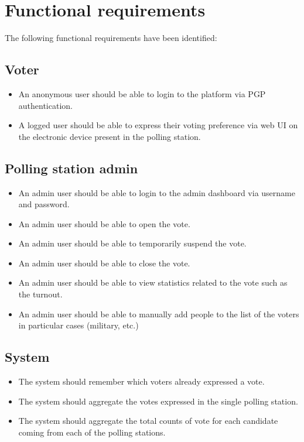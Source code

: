 \section{Functional requirements}\label{sec:func_req}
The following functional requirements have been identified:

\subsection*{Voter}
\begin{itemize}
	\setlength\itemsep{1pt}
	\item An anonymous user should be able to login to the platform via PGP authentication.
	\item A logged user should be able to express their voting preference via web UI on the electronic device present in the polling station.
\end{itemize}

\subsection*{Polling station admin}
\begin{itemize}
	\item An admin user should be able to login to the admin dashboard via username and password.
	\item An admin user should be able to open the vote.
	\item An admin user should be able to temporarily suspend the vote.
	\item An admin user should be able to close the vote.
	\item An admin user should be able to view statistics related to the vote such as the turnout.
	\item An admin user should be able to manually add people to the list of the voters in particular cases (military, etc.)
\end{itemize}

\subsection*{System}
\begin{itemize}
	\item The system should remember which voters already expressed a vote.
	\item The system should aggregate the votes expressed in the single polling station.
	\item The system should aggregate the total counts of vote for each candidate coming from each of the polling stations.
\end{itemize}

